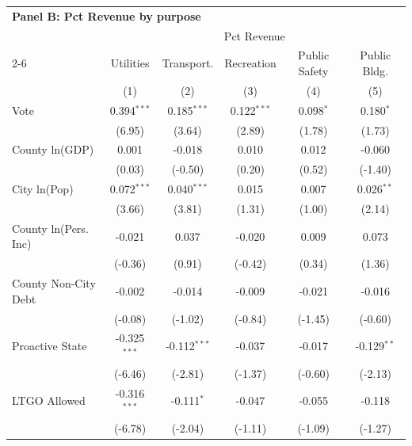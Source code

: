 \begingroup
\centering
\begin{tabular*}{\textwidth}{@{\extracolsep{\fill}}lccccc}
\multicolumn{5}{l}{\textbf{Panel B: Pct Revenue by purpose}}\\

\addlinespace
   \toprule
    & \multicolumn{5}{c}{Pct Revenue}\\
   \cmidrule(lr){2-6}
                        & Utilities      & Transport.     & Recreation    & Public Safety & Public Bldg. \\   
                        & (1)            & (2)            & (3)           & (4)           & (5)\\  
   \midrule 
   Vote                 & 0.394$^{***}$  & 0.185$^{***}$  & 0.122$^{***}$ & 0.098$^{*}$   & 0.180$^{*}$\\   
                        & (6.95)        & (3.64)        & (2.89)       & (1.78)       & (1.73)\\   
   County ln(GDP)       & 0.001          & -0.018         & 0.010         & 0.012         & -0.060\\   
                        & (0.03)        & (-0.50)       & (0.20)       & (0.52)       & (-1.40)\\   
   City ln(Pop)         & 0.072$^{***}$  & 0.040$^{***}$  & 0.015         & 0.007         & 0.026$^{**}$\\   
                        & (3.66)        & (3.81)        & (1.31)       & (1.00)       & (2.14)\\   
   County ln(Pers. Inc) & -0.021         & 0.037          & -0.020        & 0.009         & 0.073\\   
                        & (-0.36)       & (0.91)        & (-0.42)      & (0.34)       & (1.36)\\   
   County Non-City Debt & -0.002         & -0.014         & -0.009        & -0.021        & -0.016\\   
                        & (-0.08)       & (-1.02)       & (-0.84)      & (-1.45)      & (-0.60)\\   
   Proactive State      & -0.325$^{***}$ & -0.112$^{***}$ & -0.037        & -0.017        & -0.129$^{**}$\\   
                        & (-6.46)       & (-2.81)       & (-1.37)      & (-0.60)      & (-2.13)\\   
   LTGO Allowed         & -0.316$^{***}$ & -0.111$^{*}$   & -0.047        & -0.055        & -0.118\\   
                        & (-6.78)       & (-2.04)       & (-1.11)      & (-1.09)      & (-1.27)\\   

\end{tabular*}
